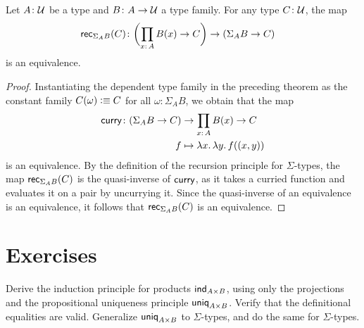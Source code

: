 \begin{cor}\label{cor:Sigma-rec(C)-is-equivalence}
    Let\/ $A\colon\univ$ be a type and\/ $B\colon A\to\univ$ a type family. For any type\/ $C\colon\univ$, the map
    \begin{align*}
        \fun{rec}_{\Sigma_AB}(C)\colon
            \biggl(
                \prod_{x\colon A}B(x)\to C
            \biggr)
            &\to
            (\Sigma_AB\to C)
    \end{align*}
    is an equivalence.
\end{cor}

\begin{proof}
    Instantiating the dependent type family in the preceding theorem as the constant family $C(\omega)\mathrel{\vcentcolon}\equiv C$ for all $\omega\colon\Sigma_AB$, we obtain that the map
    \begin{align*}
        \fun{curry}\colon
            (\Sigma_AB\to C)
            &\to
            \prod_{x\colon A}B(x)\to C\\
        f&\mapsto\lambda x.\,\lambda y.\,f((x,y))
    \end{align*}
    is an equivalence. By the definition of the recursion principle for $\Sigma$-types, the map $\mathsf{rec}_{\Sigma_AB}(C)$ is the quasi-inverse of $\mathsf{curry}$, as it takes a curried function and evaluates it on a pair by uncurrying it. Since the quasi-inverse of an equivalence is an equivalence, it follows that $\mathsf{rec}_{\Sigma_AB}(C)$ is an equivalence.
\end{proof}

\section{Exercises}

\begin{exr}
    Derive the induction principle for products\/ $\mathsf{ind}_{A\times B}$, using only the projections and the propositional uniqueness principle\/ $\mathsf{uniq}_{A\times B}$. Verify that the definitional equalities are valid. Generalize\/ $\mathsf{uniq}_{A\times B}$ to\/ $\Sigma$-types, and do the same for\/ $\Sigma$-types.
\end{exr}

